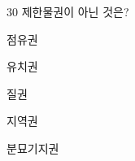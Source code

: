 \begin{question}{30}
제한물권이 아닌 것은?
\begin{choices}
  \item 점유권
  \item 유치권
  \item 질권
  \item 지역권
  \item 분묘기지권
\end{choices}
\end{question}
